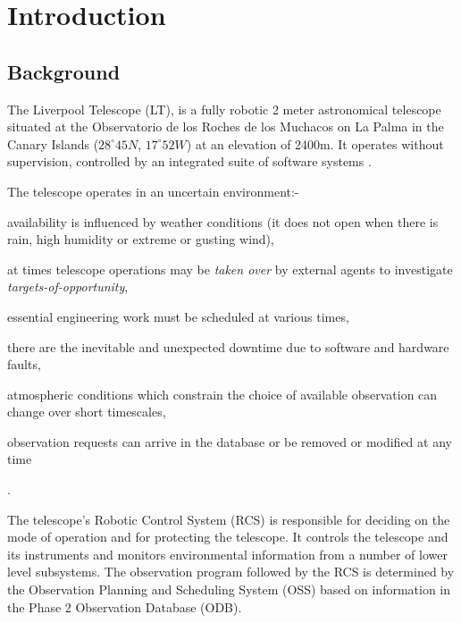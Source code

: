 \section{Introduction}
\label{sect:intro}

\subsection{Background}
\label{sect:intro_background}
The Liverpool Telescope (LT),\citep{steele04liverpool} is a fully robotic 2 meter astronomical telescope situated at the Observatorio de los Roches de los Muchacos  on La Palma in the Canary Islands ($28^{\circ}45N$, $17^{\circ}52W$) at an elevation of 2400m. It operates without supervision, controlled by an integrated suite of software systems \citep{fraser02robotic, steele97control}. 

The telescope operates in an uncertain environment:- \begin{inparaenum} \item availability is influenced by weather conditions (it does not open when there is rain, high humidity or extreme or gusting wind), \item at times telescope operations may be \emph{taken over} by external agents \citep{mottram06high, allan04estar} to investigate \emph{targets-of-opportunity}, \item essential engineering work must be scheduled at various times, \item there are the inevitable and unexpected downtime due to software and hardware faults, \item atmospheric conditions which constrain the choice of available observation can change over short timescales, \item observation requests can arrive in the database or be removed or modified at any time \end{inparaenum}.

The telescope's Robotic Control System (RCS) is responsible  for deciding on the mode of operation and for protecting the telescope. It controls the telescope and its instruments and monitors environmental information from a number of lower level subsystems. The observation program followed by the RCS is determined by the Observation Planning and Scheduling System (OSS) based on information in the Phase 2 Observation Database (ODB).


